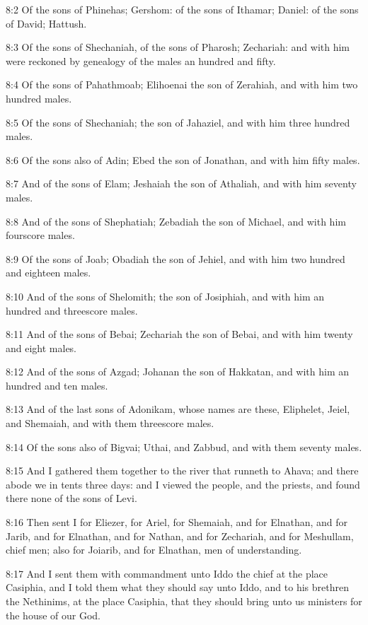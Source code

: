 8:2 Of the sons of Phinehas; Gershom: of the sons of Ithamar; Daniel:
of the sons of David; Hattush.

8:3 Of the sons of Shechaniah, of the sons of Pharosh; Zechariah: and
with him were reckoned by genealogy of the males an hundred and fifty.

8:4 Of the sons of Pahathmoab; Elihoenai the son of Zerahiah, and with
him two hundred males.

8:5 Of the sons of Shechaniah; the son of Jahaziel, and with him three
hundred males.

8:6 Of the sons also of Adin; Ebed the son of Jonathan, and with him
fifty males.

8:7 And of the sons of Elam; Jeshaiah the son of Athaliah, and with
him seventy males.

8:8 And of the sons of Shephatiah; Zebadiah the son of Michael, and
with him fourscore males.

8:9 Of the sons of Joab; Obadiah the son of Jehiel, and with him two
hundred and eighteen males.

8:10 And of the sons of Shelomith; the son of Josiphiah, and with him
an hundred and threescore males.

8:11 And of the sons of Bebai; Zechariah the son of Bebai, and with
him twenty and eight males.

8:12 And of the sons of Azgad; Johanan the son of Hakkatan, and with
him an hundred and ten males.

8:13 And of the last sons of Adonikam, whose names are these,
Eliphelet, Jeiel, and Shemaiah, and with them threescore males.

8:14 Of the sons also of Bigvai; Uthai, and Zabbud, and with them
seventy males.

8:15 And I gathered them together to the river that runneth to Ahava;
and there abode we in tents three days: and I viewed the people, and
the priests, and found there none of the sons of Levi.

8:16 Then sent I for Eliezer, for Ariel, for Shemaiah, and for
Elnathan, and for Jarib, and for Elnathan, and for Nathan, and for
Zechariah, and for Meshullam, chief men; also for Joiarib, and for
Elnathan, men of understanding.

8:17 And I sent them with commandment unto Iddo the chief at the place
Casiphia, and I told them what they should say unto Iddo, and to his
brethren the Nethinims, at the place Casiphia, that they should bring
unto us ministers for the house of our God.

